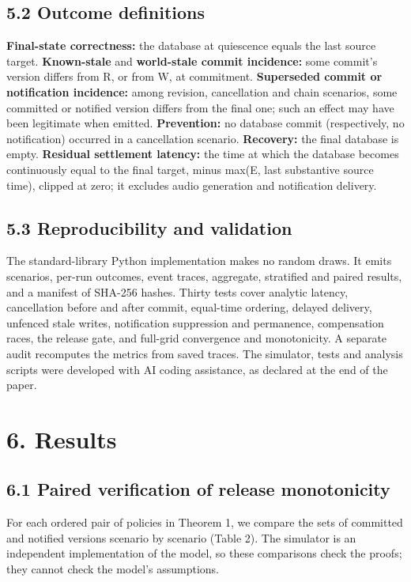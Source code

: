 \documentclass[review,12pt]{elsarticle}
\begin{document}
\subsection*{5.2 Outcome definitions}

\textbf{Final-state correctness:} the database at quiescence equals the last source target. \textbf{Known-stale} and \textbf{world-stale commit incidence:} some commit's version differs from R, or from W, at commitment. \textbf{Superseded commit or notification incidence:} among revision, cancellation and chain scenarios, some committed or notified version differs from the final one; such an effect may have been legitimate when emitted. \textbf{Prevention:} no database commit (respectively, no notification) occurred in a cancellation scenario. \textbf{Recovery:} the final database is empty. \textbf{Residual settlement latency:} the time at which the database becomes continuously equal to the final target, minus max(E, last substantive source time), clipped at zero; it excludes audio generation and notification delivery.


\subsection*{5.3 Reproducibility and validation}

The standard-library Python implementation makes no random draws. It emits scenarios, per-run outcomes, event traces, aggregate, stratified and paired results, and a manifest of SHA-256 hashes. Thirty tests cover analytic latency, cancellation before and after commit, equal-time ordering, delayed delivery, unfenced stale writes, notification suppression and permanence, compensation races, the release gate, and full-grid convergence and monotonicity. A separate audit recomputes the metrics from saved traces. The simulator, tests and analysis scripts were developed with AI coding assistance, as declared at the end of the paper.


\section*{6. Results}

\subsection*{6.1 Paired verification of release monotonicity}

For each ordered pair of policies in Theorem 1, we compare the sets of committed and notified versions scenario by scenario (Table 2). The simulator is an independent implementation of the model, so these comparisons check the proofs; they cannot check the model's assumptions.
\end{document}
